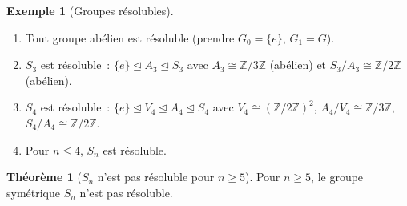 \documentclass[12pt,a4paper,openany]{book}
\theoremstyle{definition}
\newtheorem{theoreme}{Théorème}[chapter]
\newtheorem{exemple}{Exemple}[chapter]
\newcommand{\Z}{\mathbb{Z}}
\begin{document}
\begin{exemple}[Groupes résolubles]\label{ex:groupes-resolubles}
\begin{enumerate}[label=(\roman*)]
  \item Tout groupe abélien est résoluble (prendre $G_0 = \{e\}$,
    $G_1 = G$).
  \item $S_3$ est résoluble~: $\{e\} \trianglelefteq A_3 \trianglelefteq
    S_3$ avec $A_3 \cong \Z/3\Z$ (abélien) et $S_3/A_3 \cong \Z/2\Z$
    (abélien).
  \item $S_4$ est résoluble~:
    $\{e\} \trianglelefteq V_4 \trianglelefteq A_4 \trianglelefteq S_4$
    avec $V_4 \cong (\Z/2\Z)^2$, $A_4/V_4 \cong \Z/3\Z$,
    $S_4/A_4 \cong \Z/2\Z$.
  \item Pour $n \leq 4$, $S_n$ est résoluble.
\end{enumerate}
\end{exemple}

\begin{theoreme}[$S_n$ n'est pas résoluble pour $n \geq 5$]\label{thm:Sn-non-resoluble}
Pour $n \geq 5$, le groupe symétrique $S_n$ n'est pas résoluble.
\end{theoreme}
\end{document}
